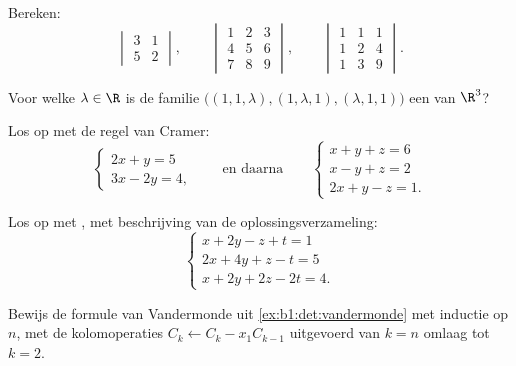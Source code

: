 \begin{exercise}[$\star$]\label{exo:b1:det:1}
Bereken:
\[
\begin{vmatrix} 3 & 1\\ 5 & 2 \end{vmatrix},
\qquad
\begin{vmatrix} 1 & 2 & 3\\ 4 & 5 & 6\\ 7 & 8 & 9\end{vmatrix},
\qquad
\begin{vmatrix} 1 & 1 & 1\\ 1 & 2 & 4\\ 1 & 3 & 9\end{vmatrix}.
\]
\end{exercise}

\begin{exercise}[$\star$]\label{exo:b1:det:2}
Voor welke $\lambda \in \R$ is de familie $\bigl((1, 1, \lambda),
(1, \lambda, 1), (\lambda, 1, 1)\bigr)$ een  van $\R^3$?
\end{exercise}

\begin{exercise}[$\star$]\label{exo:b1:det:3}
Los op met de regel van Cramer:
\[
\begin{cases}
2x + y = 5\\
3x - 2y = 4 ,
\end{cases}
\qquad\text{en daarna}\qquad
\begin{cases}
x + y + z = 6\\
x - y + z = 2\\
2x + y - z = 1 .
\end{cases}
\]
\end{exercise}

\begin{exercise}[$\star$]\label{exo:b1:det:4}
Los op met , met beschrijving van de
oplossingsverzameling:
\[
\begin{cases}
x + 2y - z + t = 1\\
2x + 4y + z - t = 5\\
x + 2y + 2z - 2t = 4 .
\end{cases}
\]
\end{exercise}

\begin{exercise}[$\star\star$]\label{exo:b1:det:5}
Bewijs de formule van Vandermonde uit
\cref{ex:b1:det:vandermonde} met inductie op $n$, met de
kolomoperaties $C_k \leftarrow C_k - x_1 C_{k-1}$ uitgevoerd van $k
= n$ omlaag tot $k = 2$.
\end{exercise}

